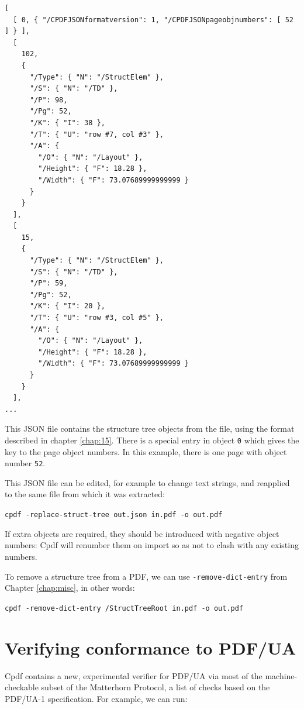 \documentclass{book}
\begin{document}
{\small\begin{verbatim}
[
  [ 0, { "/CPDFJSONformatversion": 1, "/CPDFJSONpageobjnumbers": [ 52 ] } ],
  [
    102,
    {
      "/Type": { "N": "/StructElem" },
      "/S": { "N": "/TD" },
      "/P": 98,
      "/Pg": 52,
      "/K": { "I": 38 },
      "/T": { "U": "row #7, col #3" },
      "/A": {
        "/O": { "N": "/Layout" },
        "/Height": { "F": 18.28 },
        "/Width": { "F": 73.07689999999999 }
      }
    }
  ],
  [
    15,
    {
      "/Type": { "N": "/StructElem" },
      "/S": { "N": "/TD" },
      "/P": 59,
      "/Pg": 52,
      "/K": { "I": 20 },
      "/T": { "U": "row #3, col #5" },
      "/A": {
        "/O": { "N": "/Layout" },
        "/Height": { "F": 18.28 },
        "/Width": { "F": 73.07689999999999 }
      }
    }
  ],
...
\end{verbatim}}

\noindent This JSON file contains the structure tree objects from the file, using the format described in chapter \ref{chap:15}. There is a special entry in object \texttt{0} which gives the key to the page object numbers. In this example, there is one page with object number \texttt{52}.

This JSON file can be edited, for example to change text strings, and reapplied to the same file from which it was extracted:

  \begin{framed}
    \noindent\small\verb!cpdf -replace-struct-tree out.json in.pdf -o out.pdf!
  \end{framed}

\noindent If extra objects are required, they should be introduced with negative object numbers: Cpdf will renumber them on import so as not to clash with any existing numbers.

To remove a structure tree from a PDF, we can use \texttt{-remove-dict-entry} from Chapter \ref{chap:misc}, in other words:

  \begin{framed}
    \noindent\small\verb!cpdf -remove-dict-entry /StructTreeRoot in.pdf -o out.pdf!
  \end{framed}

\section{Verifying conformance to PDF/UA}

Cpdf contains a new, experimental verifier for PDF/UA via most of the machine-checkable subset of the Matterhorn Protocol, a list of checks based on the PDF/UA-1 specification. For example, we can run:
\end{document}
